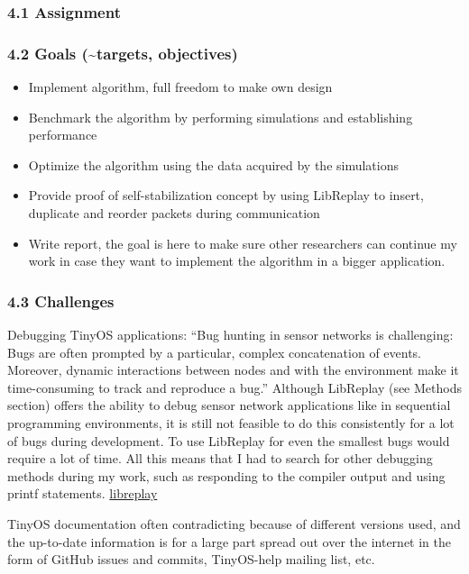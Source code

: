 \subsubsection{4.1 Assignment}\label{assignment}

\subsubsection{4.2 Goals (\textasciitilde{}targets,
objectives)}\label{goals-targets-objectives}

\begin{itemize}
\itemsep1pt\parskip0pt
\item
  Implement algorithm, full freedom to make own design
\item
  Benchmark the algorithm by performing simulations and establishing
  performance
\item
  Optimize the algorithm using the data acquired by the simulations
\item
  Provide proof of self-stabilization concept by using LibReplay to
  insert, duplicate and reorder packets during communication
\item
  Write report, the goal is here to make sure other researchers can
  continue my work in case they want to implement the algorithm in a
  bigger application.
\end{itemize}

\subsubsection{4.3 Challenges}\label{challenges}

Debugging TinyOS applications: ``Bug hunting in sensor networks is
challenging: Bugs are often prompted by a particular, complex
concatenation of events. Moreover, dynamic interactions between nodes
and with the environment make it time-consuming to track and reproduce a
bug.'' Although LibReplay (see Methods section) offers the ability to
debug sensor network applications like in sequential programming
environments, it is still not feasible to do this consistently for a lot
of bugs during development. To use LibReplay for even the smallest bugs
would require a lot of time. All this means that I had to search for
other debugging methods during my work, such as responding to the
compiler output and using printf statements.
\href{http://www.cse.chalmers.se/~olafl/papers/2015-02-ewsn-landsiedel-libreplay.pdf}{libreplay}

TinyOS documentation often contradicting because of different versions
used, and the up-to-date information is for a large part spread out over
the internet in the form of GitHub issues and commits, TinyOS-help
mailing list, etc.

